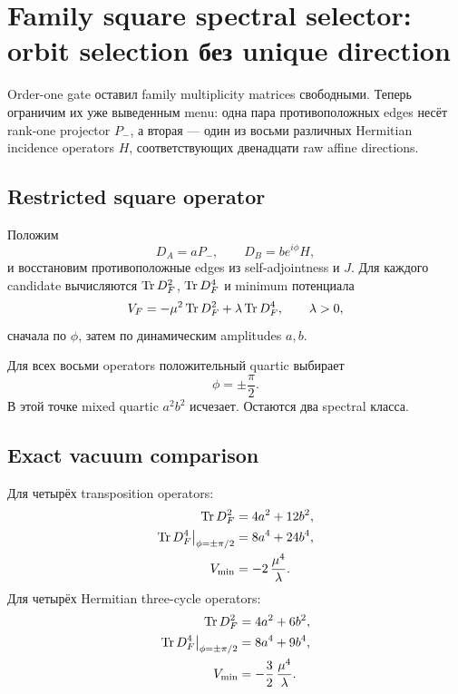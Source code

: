 \chapter{Family square spectral selector: orbit selection без unique direction}

Order-one gate оставил family multiplicity matrices свободными. Теперь
ограничим их уже выведенным menu: одна пара противоположных edges несёт
rank-one projector \(P_-\), а вторая --- один из восьми различных Hermitian
incidence operators \(H\), соответствующих двенадцати raw affine
directions.

\section{Restricted square operator}

Положим
\begin{equation}
 D_A=aP_-,
 \qquad
 D_B=b e^{i\phi}H,
\end{equation}
и восстановим противоположные edges из self-adjointness и \(J\). Для каждого
candidate вычисляются \(\operatorname{Tr} D_F^2\), \(\operatorname{Tr} D_F^4\) и minimum потенциала
\begin{equation}
 V_F=-\mu^2\operatorname{Tr} D_F^2+\lambda\operatorname{Tr} D_F^4,
 \qquad \lambda>0,
\end{equation}
сначала по \(\phi\), затем по динамическим amplitudes \(a,b\).

Для всех восьми operators положительный quartic выбирает
\begin{equation}
 \phi=\pm\frac{\pi}{2}.
\end{equation}
В этой точке mixed quartic \(a^2b^2\) исчезает. Остаются два spectral класса.

\section{Exact vacuum comparison}

Для четырёх transposition operators:
\begin{align}
 \operatorname{Tr} D_F^2&=4a^2+12b^2,\\
 \operatorname{Tr} D_F^4\big|_{\phi=\pm\pi/2}&=8a^4+24b^4,\\
 V_{\min}&=-2\,\frac{\mu^4}{\lambda}.
\end{align}
Для четырёх Hermitian three-cycle operators:
\begin{align}
 \operatorname{Tr} D_F^2&=4a^2+6b^2,\\
 \operatorname{Tr} D_F^4\big|_{\phi=\pm\pi/2}&=8a^4+9b^4,\\
 V_{\min}&=-\frac32\,\frac{\mu^4}{\lambda}.
\end{align}

